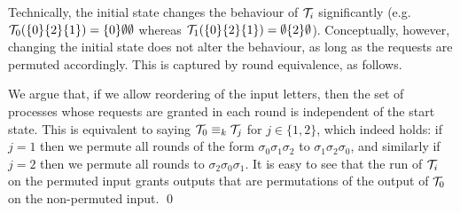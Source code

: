 \begin{example}
Technically, the initial state changes the behaviour of $\mathcal{T}_i$ significantly (e.g. $\mathcal{T}_0(\{0\}\{2\}\{1\})=\{0\}\emptyset\emptyset$ whereas $\mathcal{T}_1(\{0\}\{2\}\{1\})=\emptyset\{2\}\emptyset$). Conceptually, however, changing the initial state does not alter the behaviour, as long as the requests are permuted accordingly. This is captured by round equivalence, as follows.

We argue that, if we allow reordering of the input letters, then the set of processes whose requests are granted in each round is independent of the start state. This is equivalent to saying $\mathcal{T}_0 \equiv_k \mathcal{T}_j$ for $j\in \{1,2\}$, which indeed holds: if $j=1$ then we permute all rounds of the form $\sigma_0 \sigma_1 \sigma_2$ to $\sigma_1 \sigma_2 \sigma_0$, and similarly if $j=2$ then we permute all rounds to $\sigma_2 \sigma_0 \sigma_1$. It is easy to see that the run of $\mathcal{T}_i$ on the permuted input grants outputs that are permutations of the output of $\mathcal{T}_0$ on the non-permuted input. 
\qed
\end{example}

